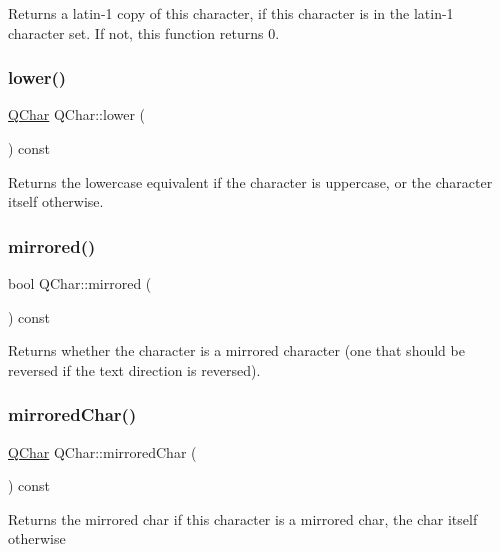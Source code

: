 Returns a latin-\/1 copy of this character, if this character is in the latin-\/1 character set. If not, this function returns 0. \mbox{\label{class_q_char_a70eb37a2ce831bffec68645ec51dc77f}} 
\subsubsection{\texorpdfstring{lower()}{lower()}}
{\footnotesize\ttfamily \mbox{\hyperlink{class_q_char}{Q\+Char}} Q\+Char\+::lower (\begin{DoxyParamCaption}{ }\end{DoxyParamCaption}) const}

Returns the lowercase equivalent if the character is uppercase, or the character itself otherwise. \mbox{\label{class_q_char_ace551e353be06621f91e605f33aa49e6}} 
\subsubsection{\texorpdfstring{mirrored()}{mirrored()}}
{\footnotesize\ttfamily bool Q\+Char\+::mirrored (\begin{DoxyParamCaption}{ }\end{DoxyParamCaption}) const}

Returns whether the character is a mirrored character (one that should be reversed if the text direction is reversed). \mbox{\label{class_q_char_a163b279dcd9ef33c54f1f8bb0e541609}} 
\subsubsection{\texorpdfstring{mirroredChar()}{mirroredChar()}}
{\footnotesize\ttfamily \mbox{\hyperlink{class_q_char}{Q\+Char}} Q\+Char\+::mirrored\+Char (\begin{DoxyParamCaption}{ }\end{DoxyParamCaption}) const}

Returns the mirrored char if this character is a mirrored char, the char itself otherwise \mbox{\label{class_q_char_a6412de50d41df09c99e4c93ed4b802dc}} 
